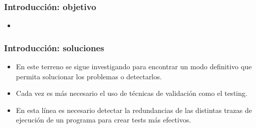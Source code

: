 \documentclass[spanish, a4paper, 12pt, final, slideColor, nototal, colorBG, pdf, noaccumulate, darkblue] {beamer}
\begin{document}
\begin{frame}
  \frametitle{Introducción: objetivo}
  \begin{itemize}
  \item
  \end{itemize}
\end{frame}

\begin{frame} %
  \frametitle{Introducción: soluciones}
  \begin{itemize}
    \item En este terreno se sigue investigando para encontrar un modo definitivo que permita solucionar los problemas o detectarlos.
    \item Cada vez es más necesario el uso de técnicas de validación como el testing.
    \item En esta línea es necesario detectar la redundancias de las distintas trazas de ejecución de un programa para crear tests más efectivos.
  \end{itemize}
\end{frame}
\end{document}
